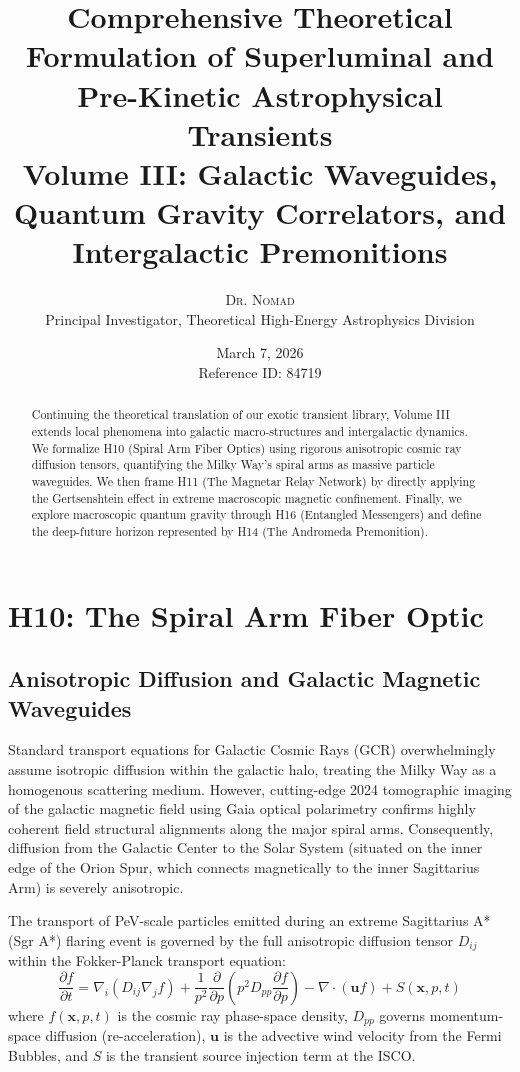 \documentclass[12pt,a4paper]{article}
\title{\textbf{Comprehensive Theoretical Formulation of Superluminal and Pre-Kinetic Astrophysical Transients}\\
\Large Volume III: Galactic Waveguides, Quantum Gravity Correlators, and Intergalactic Premonitions}
\author{\textsc{Dr. Nomad}\\
Principal Investigator, Theoretical High-Energy Astrophysics Division}
\date{March 7, 2026 \\ Reference ID: 84719}
\begin{document}
\maketitle

\begin{abstract}
Continuing the theoretical translation of our exotic transient library, Volume III extends local phenomena into galactic macro-structures and intergalactic dynamics. We formalize H10 (Spiral Arm Fiber Optics) using rigorous anisotropic cosmic ray diffusion tensors, quantifying the Milky Way's spiral arms as massive particle waveguides. We then frame H11 (The Magnetar Relay Network) by directly applying the Gertsenshtein effect in extreme macroscopic magnetic confinement. Finally, we explore macroscopic quantum gravity through H16 (Entangled Messengers) and define the deep-future horizon represented by H14 (The Andromeda Premonition).
\end{abstract}

\tableofcontents
\newpage

\section{H10: The Spiral Arm Fiber Optic}
\subsection{Anisotropic Diffusion and Galactic Magnetic Waveguides}

Standard transport equations for Galactic Cosmic Rays (GCR) overwhelmingly assume isotropic diffusion within the galactic halo, treating the Milky Way as a homogenous scattering medium. However, cutting-edge 2024 tomographic imaging of the galactic magnetic field using Gaia optical polarimetry confirms highly coherent field structural alignments along the major spiral arms. Consequently, diffusion from the Galactic Center to the Solar System (situated on the inner edge of the Orion Spur, which connects magnetically to the inner Sagittarius Arm) is severely anisotropic.

The transport of PeV-scale particles emitted during an extreme Sagittarius A* (Sgr A*) flaring event is governed by the full anisotropic diffusion tensor $D_{ij}$ within the Fokker-Planck transport equation:
\begin{equation}
    \frac{\partial f}{\partial t} = \nabla_i \left( D_{ij} \nabla_j f \right) + \frac{1}{p^2} \frac{\partial}{\partial p} \left( p^2 D_{pp} \frac{\partial f}{\partial p} \right) - \nabla \cdot (\mathbf{u} f) + S(\mathbf{x}, p, t)
\end{equation}
where $f(\mathbf{x}, p, t)$ is the cosmic ray phase-space density, $D_{pp}$ governs momentum-space diffusion (re-acceleration), $\mathbf{u}$ is the advective wind velocity from the Fermi Bubbles, and $S$ is the transient source injection term at the ISCO. 
\end{document}
